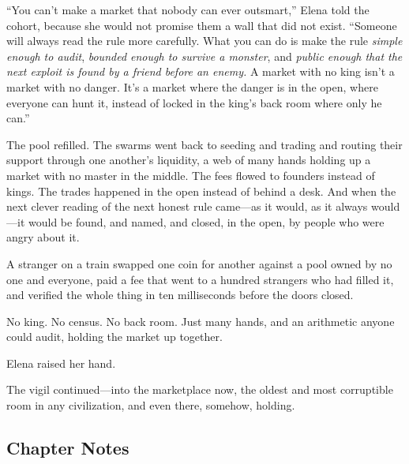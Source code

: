 \documentclass[12pt,letterpaper]{book}
\begin{document}
``You can't make a market that nobody can ever outsmart,'' Elena told the cohort,
because she would not promise them a wall that did not exist. ``Someone will always
read the rule more carefully. What you can do is make the rule \emph{simple enough to
audit}, \emph{bounded enough to survive a monster}, and \emph{public enough that the
next exploit is found by a friend before an enemy.} A market with no king isn't a
market with no danger. It's a market where the danger is in the open, where everyone
can hunt it, instead of locked in the king's back room where only he can.''

The pool refilled. The swarms went back to seeding and trading and routing their
support through one another's liquidity, a web of many hands holding up a market with
no master in the middle. The fees flowed to founders instead of kings. The trades
happened in the open instead of behind a desk. And when the next clever reading of
the next honest rule came---as it would, as it always would---it would be found, and
named, and closed, in the open, by people who were angry about it.

A stranger on a train swapped one coin for another against a pool owned by no one and
everyone, paid a fee that went to a hundred strangers who had filled it, and verified
the whole thing in ten milliseconds before the doors closed.

No king. No census. No back room. Just many hands, and an arithmetic anyone could
audit, holding the market up together.

Elena raised her hand.

The vigil continued---into the marketplace now, the oldest and most corruptible room
in any civilization, and even there, somehow, holding.

\hypertarget{chapter-24-notes}{%
\subsection{Chapter Notes}\label{chapter-24-notes}}
\end{document}
